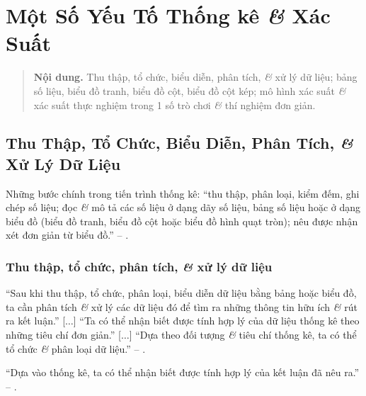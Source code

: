 \documentclass[oneside]{book}
\numberwithin{equation}{section}
\begin{document}

\chapter{Một Số Yếu Tố Thống kê \textit{\&} Xác Suất}

\begin{quotation}
	\textbf{Nội dung.} Thu thập, tổ chức, biểu diễn, phân tích, \textit{\&} xử lý dữ liệu; bảng số liệu, biểu đồ tranh, biểu đồ cột, biểu đồ cột kép; mô hình xác suất \textit{\&} xác suất thực nghiệm trong 1 số trò chơi \textit{\&} thí nghiệm đơn giản.
\end{quotation}

\section{Thu Thập, Tổ Chức, Biểu Diễn, Phân Tích, \textit{\&} Xử Lý Dữ Liệu}
Những bước chính trong tiến trình thống kê: ``thu thập, phân loại, kiểm đếm, ghi chép số liệu; đọc \textit{\&} mô tả các số liệu ở dạng dãy số liệu, bảng số liệu hoặc ở dạng biểu đồ (biểu đồ tranh, biểu đồ cột hoặc biểu đồ hình quạt tròn); nêu được nhận xét đơn giản từ biểu đồ.'' -- \cite[p. 3]{Thai_Anh_Dat_Ha_Loan_Nam_Quang_Toan_6_tap_2}.

\subsection{Thu thập, tổ chức, phân tích, \textit{\&} xử lý dữ liệu}
``Sau khi thu thập, tổ chức, phân loại, biểu diễn dữ liệu bằng bảng hoặc biểu đồ, ta cần phân tích \textit{\&} xử lý các dữ liệu đó để tìm ra những thông tin hữu ích \textit{\&} rút ra kết luận.'' [$\ldots$] ``Ta có thể nhận biết được tính hợp lý của dữ liệu thống kê theo những tiêu chí đơn giản.'' [$\ldots$] ``Dựa theo đối tượng \textit{\&} tiêu chí thống kê, ta có thể tổ chức \textit{\&} phân loại dữ liệu.'' -- \cite[p. 4]{Thai_Anh_Dat_Ha_Loan_Nam_Quang_Toan_6_tap_2}.

``Dựa vào thống kê, ta có thể nhận biết được tính hợp lý của kết luận đã nêu ra.'' -- \cite[p. 5]{Thai_Anh_Dat_Ha_Loan_Nam_Quang_Toan_6_tap_2}.
\end{document}
